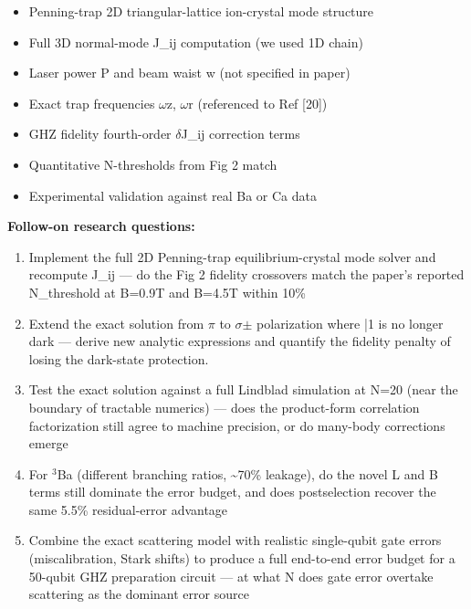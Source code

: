 \documentclass[11pt]{article}
\begin{document}
\begin{itemize}[leftmargin=1.4em,itemsep=0.2em,topsep=0.2em]
\item Penning-trap 2D triangular-lattice ion-crystal mode structure
\item Full 3D normal-mode J\_ij computation (we used 1D chain)
\item Laser power P and beam waist w (not specified in paper)
\item Exact trap frequencies $\omega$z, $\omega$r (referenced to Ref [20])
\item GHZ fidelity fourth-order $\delta$J\_ij correction terms
\item Quantitative N-thresholds from Fig 2 match
\item Experimental validation against real Ba or Ca data
\end{itemize}\noindent\textbf{Follow-on research questions:}
\begin{enumerate}[leftmargin=1.6em,itemsep=0.2em,topsep=0.2em,label=Q\arabic*.]
\item Implement the full 2D Penning-trap equilibrium-crystal mode solver and recompute J\_ij --- do the Fig 2 fidelity crossovers match the paper's reported N\_threshold at B=0.9T and B=4.5T within 10\%
\item Extend the exact solution from $\pi$ to $\sigma$$\pm$ polarization where |1 is no longer dark --- derive new analytic expressions and quantify the fidelity penalty of losing the dark-state protection.
\item Test the exact solution against a full Lindblad simulation at N=20 (near the boundary of tractable numerics) --- does the product-form correlation factorization still agree to machine precision, or do many-body corrections emerge
\item For $^3$Ba (different branching ratios, \textasciitilde{}70\% leakage), do the novel L and B terms still dominate the error budget, and does postselection recover the same 5.5\% residual-error advantage
\item Combine the exact scattering model with realistic single-qubit gate errors (miscalibration, Stark shifts) to produce a full end-to-end error budget for a 50-qubit GHZ preparation circuit --- at what N does gate error overtake scattering as the dominant error source
\end{enumerate}
\end{document}
